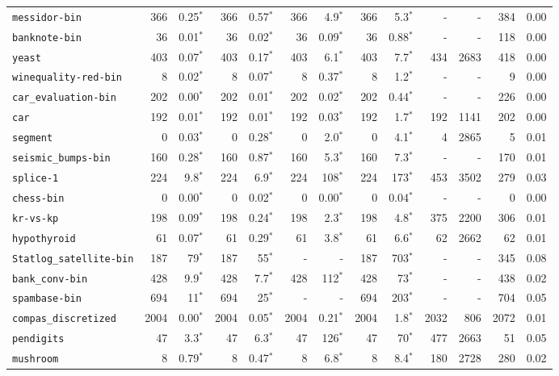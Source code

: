 \begin{tabular}{lrrrrrrrrrrrr}
\texttt{messidor-bin} & 366 & 0.25$^*$ & 366 & 0.57$^*$ & 366 & 4.9$^*$ & 366 & 5.3$^*$ & - & - & 384 & 0.00\\
\texttt{banknote-bin} & 36 & 0.01$^*$ & 36 & 0.02$^*$ & 36 & 0.09$^*$ & 36 & 0.88$^*$ & - & - & 118 & 0.00\\
\texttt{yeast} & 403 & 0.07$^*$ & 403 & 0.17$^*$ & 403 & 6.1$^*$ & 403 & 7.7$^*$ & 434 & 2683 & 418 & 0.00\\
\texttt{winequality-red-bin} & 8 & 0.02$^*$ & 8 & 0.07$^*$ & 8 & 0.37$^*$ & 8 & 1.2$^*$ & - & - & 9 & 0.00\\
\texttt{car\_evaluation-bin} & 202 & 0.00$^*$ & 202 & 0.01$^*$ & 202 & 0.02$^*$ & 202 & 0.44$^*$ & - & - & 226 & 0.00\\
\texttt{car} & 192 & 0.01$^*$ & 192 & 0.01$^*$ & 192 & 0.03$^*$ & 192 & 1.7$^*$ & 192 & 1141 & 202 & 0.00\\
\texttt{segment} & 0 & 0.03$^*$ & 0 & 0.28$^*$ & 0 & 2.0$^*$ & 0 & 4.1$^*$ & 4 & 2865 & 5 & 0.01\\
\texttt{seismic\_bumps-bin} & 160 & 0.28$^*$ & 160 & 0.87$^*$ & 160 & 5.3$^*$ & 160 & 7.3$^*$ & - & - & 170 & 0.01\\
\texttt{splice-1} & 224 & 9.8$^*$ & 224 & 6.9$^*$ & 224 & 108$^*$ & 224 & 173$^*$ & 453 & 3502 & 279 & 0.03\\
\texttt{chess-bin} & 0 & 0.00$^*$ & 0 & 0.02$^*$ & 0 & 0.00$^*$ & 0 & 0.04$^*$ & - & - & 0 & 0.00\\
\texttt{kr-vs-kp} & 198 & 0.09$^*$ & 198 & 0.24$^*$ & 198 & 2.3$^*$ & 198 & 4.8$^*$ & 375 & 2200 & 306 & 0.01\\
\texttt{hypothyroid} & 61 & 0.07$^*$ & 61 & 0.29$^*$ & 61 & 3.8$^*$ & 61 & 6.6$^*$ & 62 & 2662 & 62 & 0.01\\
\texttt{Statlog\_satellite-bin} & 187 & 79$^*$ & 187 & 55$^*$ & - & - & 187 & 703$^*$ & - & - & 345 & 0.08\\
\texttt{bank\_conv-bin} & 428 & 9.9$^*$ & 428 & 7.7$^*$ & 428 & 112$^*$ & 428 & 73$^*$ & - & - & 438 & 0.02\\
\texttt{spambase-bin} & 694 & 11$^*$ & 694 & 25$^*$ & - & - & 694 & 203$^*$ & - & - & 704 & 0.05\\
\texttt{compas\_discretized} & 2004 & 0.00$^*$ & 2004 & 0.05$^*$ & 2004 & 0.21$^*$ & 2004 & 1.8$^*$ & 2032 & 806 & 2072 & 0.01\\
\texttt{pendigits} & 47 & 3.3$^*$ & 47 & 6.3$^*$ & 47 & 126$^*$ & 47 & 70$^*$ & 477 & 2663 & 51 & 0.05\\
\texttt{mushroom} & 8 & 0.79$^*$ & 8 & 0.47$^*$ & 8 & 6.8$^*$ & 8 & 8.4$^*$ & 180 & 2728 & 280 & 0.02\\

\end{tabular}
